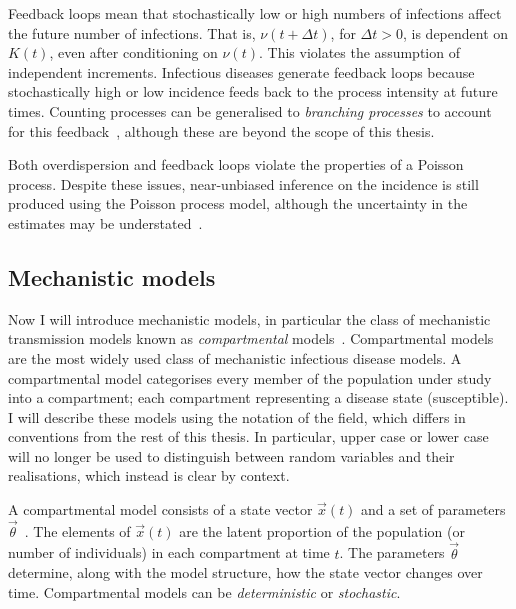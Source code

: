 \documentclass[thesis.tex]{subfiles}
\begin{document}
Feedback loops mean that stochastically low or high numbers of infections affect the future number of infections.
That is, $\nu(t+\Delta t)$, for $\Delta t > 0$, is dependent on $K(t)$, even after conditioning on $\nu(t)$.
This violates the assumption of independent increments.
Infectious diseases generate feedback loops because stochastically high or low incidence feeds back to the process intensity at future times.
Counting processes can be generalised to \emph{branching processes} to account for this feedback~\autocite[246]{yanDistribution}, although these are beyond the scope of this thesis.

Both overdispersion and feedback loops violate the properties of a Poisson process.
Despite these issues, near-unbiased inference on the incidence is still produced using the Poisson process model, although the uncertainty in the estimates may be understated~\autocite{beckerDependent}.


\subsection{Mechanistic models} \label{SEIR:sec:mechanistic-models}

Now I will introduce mechanistic models, in particular the class of mechanistic transmission models known as \emph{compartmental} models~\autocite{andersonInfectious,keelingModeling}.
Compartmental models are the most widely used class of mechanistic infectious disease models.
A compartmental model categorises every member of the population under study into a compartment; each compartment representing a disease state (\eg susceptible).
I will describe these models using the notation of the field, which differs in conventions from the rest of this thesis.
In particular, upper case or lower case will no longer be used to distinguish between random variables and their realisations, which instead is clear by context.

A compartmental model consists of a state vector $\vec{x}(t)$ and a set of parameters $\vec{\theta}$~\autocite{birrellEvidence,dukicTracking,corbellaThesis}.
The elements of $\vec{x}(t)$ are the latent proportion of the population (or number of individuals) in each compartment at time $t$.
The parameters $\vec{\theta}$ determine, along with the model structure, how the state vector changes over time.
Compartmental models can be \emph{deterministic} or \emph{stochastic}.
\end{document}
